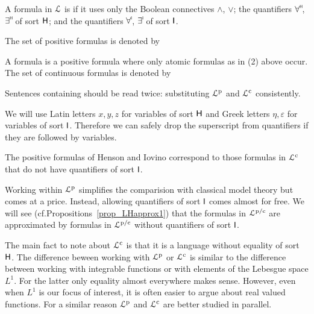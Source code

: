 \documentclass[10pt,oneside]{amsproc}
\renewcommand*{\emph}[1]{%
   \smash{\tikz[baseline]\node[rectangle, fill=teal!25, rounded corners, inner xsep=0.5ex, inner ysep=0.2ex, anchor=base, minimum height = 2.7ex]{\strut #1};}}
\newcommand\dangersign[1][3.5ex]{%
  \renewcommand\stacktype{L}%
  \scaleto{\stackon[1.9pt]{\Huge\color{red}$\triangle$}{\color{red}\bfseries\small !}}{#1}%
}
\begin{document}
\begin{definition}\label{def_LL}
  A formula in ${\EuScript L}$ is \emph{positive\/} if it uses only the Boolean connectives $\wedge$, $\vee$; the quantifiers $\forall\raisebox{1.1ex}{\scaleto{\sf H}{.8ex}\kern-.2ex}$, $\exists\raisebox{1.1ex}{\scaleto{\sf H}{.8ex}\kern-.2ex}$ of sort ${\sf H}$; and the quantifiers $\forall\raisebox{1.1ex}{\scaleto{\sf I}{.8ex}\kern-.2ex}$, $\exists\raisebox{1.1ex}{\scaleto{\sf I}{.8ex}\kern-.2ex}$ of sort ${\sf I}$.

  The set of positive formulas is denoted by \emph{${\EuScript L}^{\rm p}$.}

  A \emph{continuous\/} formula is a positive formula where only atomic formulas as in (2) above occur.
  The set of continuous formulas is denoted by \emph{${\EuScript L}^{\rm c}$.}

  Sentences containing \emph{${\EuScript L}^{\rm p/c}$\/} should be read twice: substituting ${\EuScript L}^{\rm p}$ and ${\EuScript L}^{\rm c}$ consistently. 

  We will use Latin letters $x,y,z$ for variables of sort ${\sf H}$ and Greek letters $\eta,\varepsilon$ for variables of sort ${\sf I}$.
  Therefore we can safely drop the superscript from quantifiers if they are followed by variables.
\end{definition}


The positive formulas of Henson and Iovino correspond to those formulas in ${\EuScript L}^{\rm c}$ that do not have quantifiers of sort ${\sf I}$.

Working within ${\EuScript L}^{\rm p}$ simplifies the comparision with classical model theory but comes at a price.
Instead, allowing quantifiers of sort ${\sf I}$ comes almost for free.
We will see (cf.\@ Propositions~\ref{prop_LHapprox1}) that the formulas in ${\EuScript L}^{\rm p/c}$ are approximated by formulas in ${\EuScript L}^{\rm p/c}$ without quantifiers of sort ${\sf I}$.

The main fact to note about ${\EuScript L}^{\rm c}$ is that it is a language without equality of sort ${\sf H}$.
The difference beween working with ${\EuScript L}^{\rm p}$ or ${\EuScript L}^{\rm c}$ is similar to the difference between working with integrable functions or with elements of the Lebesgue space $L^1$.
For the latter only equality almost everywhere makes sense.
However, even when $L^1$ is our focus of interest, it is often easier to argue about real valued functions.
For a similar reason ${\EuScript L}^{\rm p}$ and ${\EuScript L}^{\rm c}$ are better studied in parallel.
\end{document}
